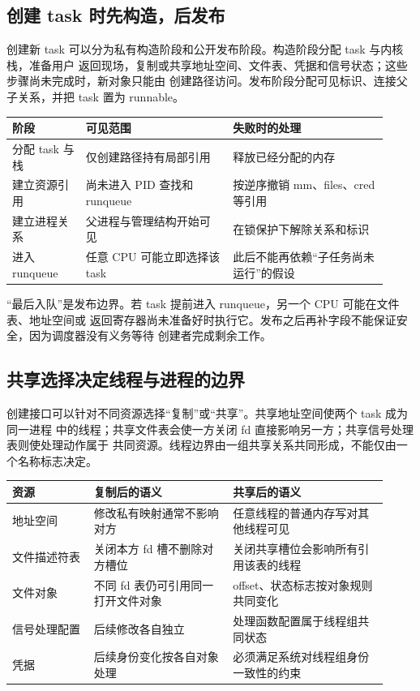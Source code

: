 \subsection{创建 task 时先构造，后发布}

创建新 task 可以分为私有构造阶段和公开发布阶段。构造阶段分配 task 与内核栈，准备用户
返回现场，复制或共享地址空间、文件表、凭据和信号状态；这些步骤尚未完成时，新对象只能由
创建路径访问。发布阶段分配可见标识、连接父子关系，并把 task 置为 runnable。

\begin{longtable}{|L{0.18\linewidth}|L{0.36\linewidth}|L{0.38\linewidth}|}
\toprule
阶段 & 可见范围 & 失败时的处理 \\
\midrule
分配 task 与栈 & 仅创建路径持有局部引用 & 释放已经分配的内存 \\\tablerowrule
建立资源引用 & 尚未进入 PID 查找和 runqueue & 按逆序撤销 mm、files、cred 等引用 \\\tablerowrule
建立进程关系 & 父进程与管理结构开始可见 & 在锁保护下解除关系和标识 \\\tablerowrule
进入 runqueue & 任意 CPU 可能立即选择该 task & 此后不能再依赖“子任务尚未运行”的假设 \\
\bottomrule
\end{longtable}

“最后入队”是发布边界。若 task 提前进入 runqueue，另一个 CPU 可能在文件表、地址空间或
返回寄存器尚未准备好时执行它。发布之后再补字段不能保证安全，因为调度器没有义务等待
创建者完成剩余工作。

\subsection{共享选择决定线程与进程的边界}

创建接口可以针对不同资源选择“复制”或“共享”。共享地址空间使两个 task 成为同一进程
中的线程；共享文件表会使一方关闭 fd 直接影响另一方；共享信号处理表则使处理动作属于
共同资源。线程边界由一组共享关系共同形成，不能仅由一个名称标志决定。

\begin{longtable}{|L{0.2\linewidth}|L{0.34\linewidth}|L{0.38\linewidth}|}
\toprule
资源 & 复制后的语义 & 共享后的语义 \\
\midrule
地址空间 & 修改私有映射通常不影响对方 & 任意线程的普通内存写对其他线程可见 \\\tablerowrule
文件描述符表 & 关闭本方 fd 槽不删除对方槽位 & 关闭共享槽位会影响所有引用该表的线程 \\\tablerowrule
文件对象 & 不同 fd 表仍可引用同一打开文件对象 & offset、状态标志按对象规则共同变化 \\\tablerowrule
信号处理配置 & 后续修改各自独立 & 处理函数配置属于线程组共同状态 \\\tablerowrule
凭据 & 后续身份变化按各自对象处理 & 必须满足系统对线程组身份一致性的约束 \\
\bottomrule
\end{longtable}

